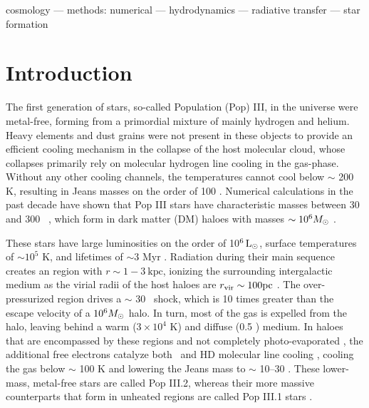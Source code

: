 \documentclass[useAMS,usenatbib]{mn2e}
\begin{document}
\begin{keywords}
  cosmology --- methods: numerical --- hydrodynamics ---
  radiative transfer --- star formation
\end{keywords}

\section{Introduction}

The first generation of stars, so-called Population (Pop) III, in the
universe were metal-free, forming from a primordial mixture of mainly
hydrogen and helium.  Heavy elements and dust grains were not present
in these objects to provide an efficient cooling mechanism in the
collapse of the host molecular cloud, whose collapses primarily rely
on molecular hydrogen line cooling in the gas-phase.  Without any
other cooling channels, the temperatures cannot cool below $\sim$ 200
K, resulting in Jeans masses on the order of 100 \Ms.  Numerical
calculations in the past decade have shown that Pop III stars
have characteristic masses between 30 and 300
\Ms~\citep[e.g.][]{ABN02, Bromm02_P3, OShea07a}, which form in dark
matter (DM) haloes with masses $\sim 10^6 \Ms$
\citep[e.g.][]{MacLow86, Shapiro87, Tegmark97}.

These stars have large luminosities on the order of 10$^6 {\rm\,L_\odot}$,
surface temperatures of $\sim 10^5$ K, and lifetimes of $\sim3$ Myr
\citep{Bond84, Schaerer02}.  Radiation during their main sequence
creates an \hii region with $r \sim 1-3~\mathrm{kpc}$, ionizing the
surrounding intergalactic medium as the virial radii of the host
haloes are $r_{\rm vir} \sim 100 \mathrm{pc}$ \citep{Whalen04,
  Kitayama04, Alvarez06, Abel07}.  The over-pressurized \hii region
drives a $\sim$ 30 \kms~shock, which is 10 times greater than the
escape velocity of a $10^6 \Ms$ halo.  In turn, most of the gas is
expelled from the halo, leaving behind a warm ($3 \times 10^4$ K) and
diffuse (0.5 \cubecm) medium.  In haloes that are encompassed by these
\hii regions and not completely photo-evaporated \citep{Shapiro04,
  whalen08}, the additional free electrons catalyze both \hh~and HD
molecular line cooling \citep{OShea05, Johnson06, Yoshida07,
  McGreer08}, cooling the gas below $\sim$ 100 K and lowering the
Jeans mass to $\sim$ 10--30 \Ms.  These lower-mass, metal-free stars
are called Pop III.2, whereas their more massive counterparts
that form in unheated regions are called Pop III.1 stars
\citep{Norman08}.
\end{document}

